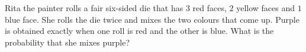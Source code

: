 Rita the painter rolls a fair six-sided die that has $3$ red faces, $2$ yellow faces and $1$ blue face. She rolls the die twice and mixes the two colours that come up. Purple is obtained exactly when one roll is red and the other is blue. What is the probability that she mixes purple?

